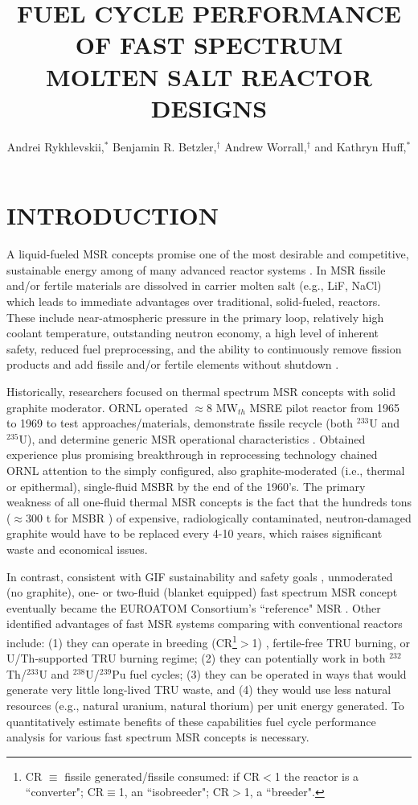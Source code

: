 \documentclass{anstrans}
\title{FUEL CYCLE PERFORMANCE OF FAST SPECTRUM \\
  MOLTEN SALT REACTOR DESIGNS}
\author{Andrei Rykhlevskii,$^{*}$ Benjamin R. Betzler,$^{\dagger}$ Andrew Worrall,$^{\dagger}$ and Kathryn Huff,$^{*}$}
\institute{
$^{*}$Dept. of Nuclear, Plasma, and Radiological Engineering, University of Illinois at 
  Urbana-Champaign, Urbana, IL \\ andreir2@illinois.edu
\and
$^{\dagger}$Oak Ridge National Laboratory, 1 Bethel Valley Road, Oak Ridge, TN, USA
}
\begin{document}
\section{INTRODUCTION} 
\label{sec:intro}
A liquid-fueled \gls{MSR} concepts promise one of the most desirable and competitive, sustainable energy among of many advanced reactor systems \cite{siemer_why_2015}. In \gls{MSR} fissile and/or fertile materials are dissolved in carrier molten salt (e.g., LiF, NaCl) which leads to immediate advantages over traditional, solid-fueled, reactors. These include near-atmospheric pressure in the primary loop, relatively high coolant temperature, outstanding neutron economy, a high level of inherent safety,
reduced fuel preprocessing, and the ability to continuously remove fission products and add fissile and/or fertile elements without shutdown \cite{leblanc_molten_2010}. 

Historically, researchers focused on thermal spectrum \gls{MSR} concepts with solid graphite moderator.  \gls{ORNL} operated $\approx$8 MW$_{th}$ \gls{MSRE} pilot reactor from 1965 to 1969 to test approaches/materials, demonstrate fissile recycle (both $^{233}$U and $^{235}$U), and determine generic \gls{MSR} operational characteristics \cite{macpherson_molten_1985}. Obtained experience plus promising breakthrough in reprocessing technology \cite{whatley_engineering_1970} chained \gls{ORNL} attention to the simply configured, also graphite-moderated (i.e., thermal or epithermal), single-fluid \gls{MSBR} by the end of the 1960's. The primary weakness of all one-fluid thermal \gls{MSR} concepts is the fact that the hundreds tons ($\approx$300 t for \gls{MSBR} \cite{robertson_conceptual_1971}) of expensive, radiologically contaminated, neutron-damaged graphite would have to be replaced every 4-10 years, which raises significant waste and economical issues.

In contrast, consistent with \gls{GIF} sustainability and safety goals \cite{gif_generation_2015}, unmoderated (no graphite), one- or two-fluid (blanket equipped) fast spectrum \gls{MSR} concept eventually became the EUROATOM Consortium's ``reference" \gls{MSR} \cite{noauthor_final_2015}. Other identified advantages of fast \gls{MSR} systems comparing with conventional reactors include: (1) they can operate in breeding (CR\footnote{\gls{CR} $\equiv$ fissile generated/fissile consumed: if CR$<$1 the reactor is a ``converter"; CR$\equiv$1, an ``isobreeder"; CR$>$1, a ``breeder".}$>$1) \cite{noauthor_final_2015,simmons_assessment_1974,mourogov_potentialities_2006}, fertile-free \gls{TRU} burning, or U/Th-supported \gls{TRU} burning \cite{ignatiev_progress_2007} regime; (2) they can potentially work in both $^{232}$Th/$^{233}$U and $^{238}$U/$^{239}$Pu fuel cycles; (3) they can be operated in ways that would generate very little long-lived \gls{TRU} waste, and (4) they would use less natural resources (e.g., natural uranium, natural thorium) per unit energy generated. To quantitatively estimate benefits of these capabilities fuel cycle performance analysis for various fast spectrum \gls{MSR} concepts is necessary.
\end{document}

